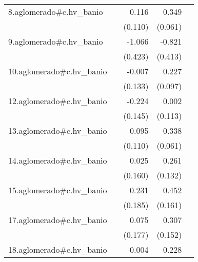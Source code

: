 {\begin{longtable}{l*{4}{D{.}{.}{-1}}}
\addlinespace
8.aglomerado#c.hv\_banio&                     &       0.116         &       0.349\sym{***}&                     \\
            &                     &     (0.110)         &     (0.061)         &                     \\
\addlinespace
9.aglomerado#c.hv\_banio&                     &      -1.066\sym{*}  &      -0.821\sym{*}  &                     \\
            &                     &     (0.423)         &     (0.413)         &                     \\
\addlinespace
10.aglomerado#c.hv\_banio&                     &      -0.007         &       0.227\sym{*}  &                     \\
            &                     &     (0.133)         &     (0.097)         &                     \\
\addlinespace
12.aglomerado#c.hv\_banio&                     &      -0.224         &       0.002         &                     \\
            &                     &     (0.145)         &     (0.113)         &                     \\
\addlinespace
13.aglomerado#c.hv\_banio&                     &       0.095         &       0.338\sym{***}&                     \\
            &                     &     (0.110)         &     (0.061)         &                     \\
\addlinespace
14.aglomerado#c.hv\_banio&                     &       0.025         &       0.261\sym{*}  &                     \\
            &                     &     (0.160)         &     (0.132)         &                     \\
\addlinespace
15.aglomerado#c.hv\_banio&                     &       0.231         &       0.452\sym{**} &                     \\
            &                     &     (0.185)         &     (0.161)         &                     \\
\addlinespace
17.aglomerado#c.hv\_banio&                     &       0.075         &       0.307\sym{*}  &                     \\
            &                     &     (0.177)         &     (0.152)         &                     \\
\addlinespace
18.aglomerado#c.hv\_banio&                     &      -0.004         &       0.228\sym{***}&                     \\

\end{longtable}}
